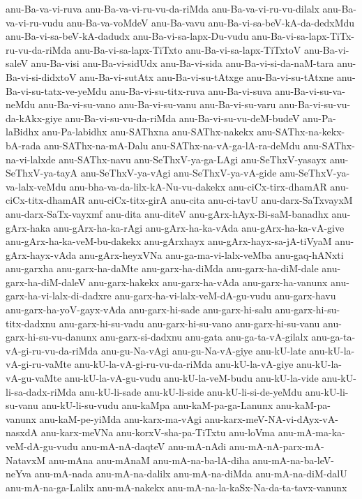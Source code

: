 {anu-Ba-va-vi-ruva
anu-Ba-va-vi-ru-vu-da-riMda
anu-Ba-va-vi-ru-vu-dilalx
anu-Ba-va-vi-ru-vudu
anu-Ba-va-voMdeV
anu-Ba-vavu
anu-Ba-vi-sa-beV-kA-da-dedxMdu
anu-Ba-vi-sa-beV-kA-dadudx
anu-Ba-vi-sa-lapx-Du-vudu
anu-Ba-vi-sa-lapx-TiTx-ru-vu-da-riMda
anu-Ba-vi-sa-lapx-TiTxto
anu-Ba-vi-sa-lapx-TiTxtoV
anu-Ba-vi-saleV
anu-Ba-visi
anu-Ba-vi-sidUdx
anu-Ba-vi-sida
anu-Ba-vi-si-da-naM-tara
anu-Ba-vi-si-didxtoV
anu-Ba-vi-sutAtx
anu-Ba-vi-su-tAtxge
anu-Ba-vi-su-tAtxne
anu-Ba-vi-su-tatx-ve-yeMdu
anu-Ba-vi-su-titx-ruva
anu-Ba-vi-suva
anu-Ba-vi-su-va-neMdu
anu-Ba-vi-su-vano
anu-Ba-vi-su-vanu
anu-Ba-vi-su-varu
anu-Ba-vi-su-vu-da-kAkx-giye
anu-Ba-vi-su-vu-da-riMda
anu-Ba-vi-su-vu-deM-budeV
anu-Pa-laBidhx
anu-Pa-labidhx
anu-SAThxna
anu-SAThx-nakekx
anu-SAThx-na-kekx-bA-rada
anu-SAThx-na-mA-Dalu
anu-SAThx-na-vA-ga-lA-ra-deMdu
anu-SAThx-na-vi-lalxde
anu-SAThx-navu
anu-SeThxV-ya-ga-LAgi
anu-SeThxV-yasayx
anu-SeThxV-ya-tayA
anu-SeThxV-ya-vAgi
anu-SeThxV-ya-vA-gide
anu-SeThxV-ya-va-lalx-veMdu
anu-bha-va-da-lilx-kA-Nu-vu-dakekx
anu-ciCx-tirx-dhamAR
anu-ciCx-titx-dhamAR
anu-ciCx-titx-girA
anu-cita
anu-ci-tavU
anu-darx-SaTxvayxM
anu-darx-SaTx-vayxmf
anu-dita
anu-diteV
anu-gArx-hAyx-Bi-saM-banadhx
anu-gArx-haka
anu-gArx-ha-ka-rAgi
anu-gArx-ha-ka-vAda
anu-gArx-ha-ka-vA-give
anu-gArx-ha-ka-veM-bu-dakekx
anu-gArxhayx
anu-gArx-hayx-sa-jA-tiVyaM
anu-gArx-hayx-vAda
anu-gArx-heyxVNa
anu-ga-ma-vi-lalx-veMba
anu-gaq-hANxti
anu-garxha
anu-garx-ha-daMte
anu-garx-ha-diMda
anu-garx-ha-diM-dale
anu-garx-ha-diM-daleV
anu-garx-hakekx
anu-garx-ha-vAda
anu-garx-ha-vanunx
anu-garx-ha-vi-lalx-di-dadxre
anu-garx-ha-vi-lalx-veM-dA-gu-vudu
anu-garx-havu
anu-garx-ha-yoV-gayx-vAda
anu-garx-hi-sade
anu-garx-hi-salu
anu-garx-hi-su-titx-dadxnu
anu-garx-hi-su-vadu
anu-garx-hi-su-vano
anu-garx-hi-su-vanu
anu-garx-hi-su-vu-danunx
anu-garx-si-dadxnu
anu-gata
anu-ga-ta-vA-gilalx
anu-ga-ta-vA-gi-ru-vu-da-riMda
anu-gu-Na-vAgi
anu-gu-Na-vA-giye
anu-kU-late
anu-kU-la-vA-gi-ru-vaMte
anu-kU-la-vA-gi-ru-vu-da-riMda
anu-kU-la-vA-giye
anu-kU-la-vA-gu-vaMte
anu-kU-la-vA-gu-vudu
anu-kU-la-veM-budu
anu-kU-la-vide
anu-kU-li-sa-dadx-riMda
anu-kU-li-sade
anu-kU-li-side
anu-kU-li-si-de-yeMdu
anu-kU-li-su-vanu
anu-kU-li-su-vudu
anu-kaMpa
anu-kaM-pa-ga-Lanunx
anu-kaM-pa-vanunx
anu-kaM-pe-yiMda
anu-karx-ma-vAgi
anu-karx-meV-NA-vi-dAyx-vA-nasxdA
anu-karx-meVNa
anu-korxV-sha-pa-TiTxtu
anu-loVma
anu-mA-ma-ka-veM-dA-gu-vudu
anu-mA-nA-daqteV
anu-mA-nAdi
anu-mA-nA-parx-mA-NatavxM
anu-mAna
anu-mAnaM
anu-mA-na-ba-lA-diha
anu-mA-na-ba-leV-neYva
anu-mA-nada
anu-mA-na-dalilx
anu-mA-na-diMda
anu-mA-na-diM-dalU
anu-mA-na-ga-Lalilx
anu-mA-nakekx
anu-mA-na-la-kaSx-Na-da-ta-tavx-vanunx
}
